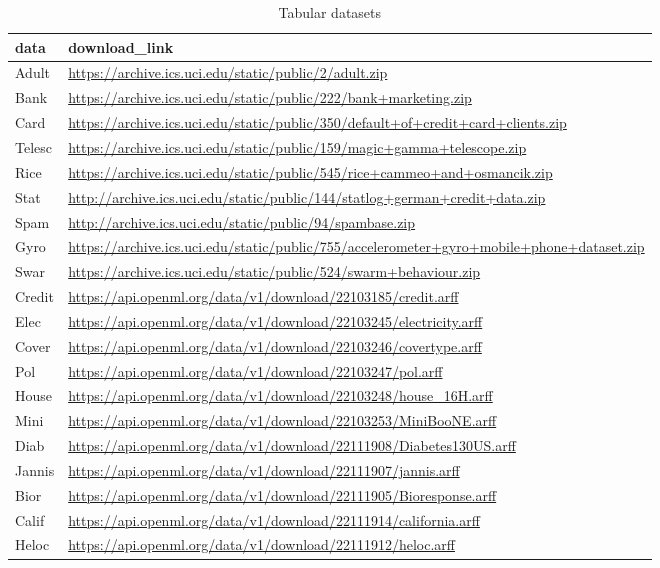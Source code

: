 \documentclass{article} %
\renewcommand{\>}{{\rightarrow}}
\renewcommand{\=}{\stackrel{\triangle}{=}}
\newcommand{\0}{{\mathbf 0}}
\begin{document}
\begin{table}[t]
\caption{Tabular datasets}
\label{tab-data-gen}
\begin{center}
\begin{tabular}{|p{.75cm}|p{12.25cm}|}
\hline
 data  &download\_link
\\ \hline 
Adult   &\url{https://archive.ics.uci.edu/static/public/2/adult.zip} \\
Bank     &\url{https://archive.ics.uci.edu/static/public/222/bank+marketing.zip} \\
Card     &\url{https://archive.ics.uci.edu/static/public/350/default+of+credit+card+clients.zip} \\
Telesc      &\url{https://archive.ics.uci.edu/static/public/159/magic+gamma+telescope.zip} \\
Rice       &\url{https://archive.ics.uci.edu/static/public/545/rice+cammeo+and+osmancik.zip} \\
Stat      &\url{http://archive.ics.uci.edu/static/public/144/statlog+german+credit+data.zip} \\
Spam   &\url{http://archive.ics.uci.edu/static/public/94/spambase.zip} \\
Gyro       &\url{https://archive.ics.uci.edu/static/public/755/accelerometer+gyro+mobile+phone+dataset.zip} \\
Swar        &\url{https://archive.ics.uci.edu/static/public/524/swarm+behaviour.zip} \\
Credit        &\url{https://api.openml.org/data/v1/download/22103185/credit.arff} \\
Elec    &\url{https://api.openml.org/data/v1/download/22103245/electricity.arff} \\
Cover    &\url{https://api.openml.org/data/v1/download/22103246/covertype.arff} \\
Pol      &\url{https://api.openml.org/data/v1/download/22103247/pol.arff}\\
House    &\url{https://api.openml.org/data/v1/download/22103248/house_16H.arff}\\
Mini     &\url{https://api.openml.org/data/v1/download/22103253/MiniBooNE.arff}\\
Diab      &\url{https://api.openml.org/data/v1/download/22111908/Diabetes130US.arff}\\
Jannis   &\url{https://api.openml.org/data/v1/download/22111907/jannis.arff} \\
Bior      &\url{https://api.openml.org/data/v1/download/22111905/Bioresponse.arff}\\
Calif     &\url{https://api.openml.org/data/v1/download/22111914/california.arff}\\
Heloc   &\url{https://api.openml.org/data/v1/download/22111912/heloc.arff}\\
\hline 
\end{tabular}
\end{center}
\end{table}
\end{document}
